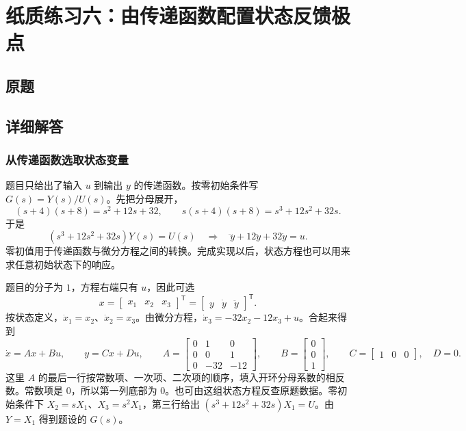 \chapter{纸质练习六：由传递函数配置状态反馈极点}

\section{原题}


\section{详细解答}


\subsection{从传递函数选取状态变量}

\sol 题目只给出了输入 $u$ 到输出 $y$ 的传递函数。按零初始条件写 $G(s)=Y(s)/U(s)$。先把分母展开，
\[
    (s+4)(s+8)=s^2+12s+32,\qquad
    s(s+4)(s+8)=s^3+12s^2+32s.
\]
于是
\[
    (s^3+12s^2+32s)Y(s)=U(s)
    \quad\Longrightarrow\quad
    \dddot y+12\ddot y+32\dot y=u .
\]
零初值用于传递函数与微分方程之间的转换。完成实现以后，状态方程也可以用来求任意初始状态下的响应。

题目的分子为 $1$，方程右端只有 $u$，因此可选
\[
    x=\begin{bmatrix}x_1&x_2&x_3\end{bmatrix}^{\mathsf T}
     =\begin{bmatrix}y&\dot y&\ddot y\end{bmatrix}^{\mathsf T}.
\]
按状态定义，$\dot x_1=x_2$、$\dot x_2=x_3$。由微分方程，$\dot x_3=-32x_2-12x_3+u$。合起来得到
\[
    \dot x=Ax+Bu,\qquad y=Cx+Du,
    \qquad
    A=\begin{bmatrix}0&1&0\\0&0&1\\0&-32&-12\end{bmatrix},
    \qquad B=\begin{bmatrix}0\\0\\1\end{bmatrix},
    \qquad C=\begin{bmatrix}1&0&0\end{bmatrix},\quad D=0.
\]
这里 $A$ 的最后一行按常数项、一次项、二次项的顺序，填入开环分母系数的相反数。常数项是 $0$，所以第一列底部为 $0$。也可由这组状态方程反查原题数据。零初始条件下 $X_2=sX_1$、$X_3=s^2X_1$，第三行给出 $(s^3+12s^2+32s)X_1=U$。由 $Y=X_1$ 得到题设的 $G(s)$。

